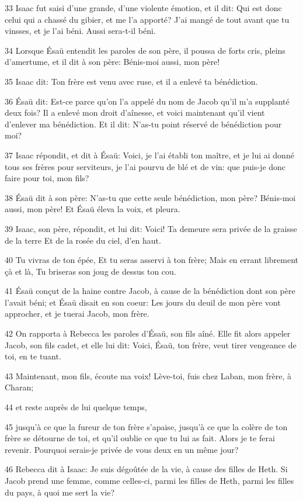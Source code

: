 \par 33 Isaac fut saisi d'une grande, d'une violente émotion, et il dit: Qui est donc celui qui a chassé du gibier, et me l'a apporté? J'ai mangé de tout avant que tu vinsses, et je l'ai béni. Aussi sera-t-il béni.
\par 34 Lorsque Ésaü entendit les paroles de son père, il poussa de forts cris, pleins d'amertume, et il dit à son père: Bénis-moi aussi, mon père!
\par 35 Isaac dit: Ton frère est venu avec ruse, et il a enlevé ta bénédiction.
\par 36 Ésaü dit: Est-ce parce qu'on l'a appelé du nom de Jacob qu'il m'a supplanté deux fois? Il a enlevé mon droit d'aînesse, et voici maintenant qu'il vient d'enlever ma bénédiction. Et il dit: N'as-tu point réservé de bénédiction pour moi?
\par 37 Isaac répondit, et dit à Ésaü: Voici, je l'ai établi ton maître, et je lui ai donné tous ses frères pour serviteurs, je l'ai pourvu de blé et de vin: que puis-je donc faire pour toi, mon fils?
\par 38 Ésaü dit à son père: N'as-tu que cette seule bénédiction, mon père? Bénis-moi aussi, mon père! Et Ésaü éleva la voix, et pleura.
\par 39 Isaac, son père, répondit, et lui dit: Voici! Ta demeure sera privée de la graisse de la terre Et de la rosée du ciel, d'en haut.
\par 40 Tu vivras de ton épée, Et tu seras asservi à ton frère; Mais en errant librement çà et là, Tu briseras son joug de dessus ton cou.
\par 41 Ésaü conçut de la haine contre Jacob, à cause de la bénédiction dont son père l'avait béni; et Ésaü disait en son coeur: Les jours du deuil de mon père vont approcher, et je tuerai Jacob, mon frère.
\par 42 On rapporta à Rebecca les paroles d'Ésaü, son fils aîné. Elle fit alors appeler Jacob, son fils cadet, et elle lui dit: Voici, Ésaü, ton frère, veut tirer vengeance de toi, en te tuant.
\par 43 Maintenant, mon fils, écoute ma voix! Lève-toi, fuis chez Laban, mon frère, à Charan;
\par 44 et reste auprès de lui quelque temps,
\par 45 jusqu'à ce que la fureur de ton frère s'apaise, jusqu'à ce que la colère de ton frère se détourne de toi, et qu'il oublie ce que tu lui as fait. Alors je te ferai revenir. Pourquoi serais-je privée de vous deux en un même jour?
\par 46 Rebecca dit à Isaac: Je suis dégoûtée de la vie, à cause des filles de Heth. Si Jacob prend une femme, comme celles-ci, parmi les filles de Heth, parmi les filles du pays, à quoi me sert la vie?

